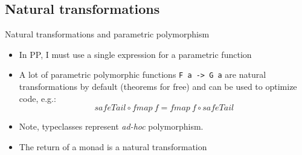 \documentclass[presentation]{beamer}
\begin{document}
\subsection{Natural transformations}
\label{sec:org1a180d2}
\begin{frame}[fragile,label={sec:orge322de5}]{Natural transformations and parametric polymorphism}
 \begin{itemize}
\item In PP, I must use a single expression for a parametric function
\item A lot of parametric polymorphic functions \texttt{F a -> G a} are natural
transformations by default (theorems for free) and can be used to optimize
code, e.g.: $$safeTail \circ fmap~f = fmap~f \circ safeTail$$
\item Note, typeclasses represent \emph{ad-hoc} polymorphism.
\item The return of a monad is a natural transformation
\end{itemize}
\end{frame}
\end{document}
